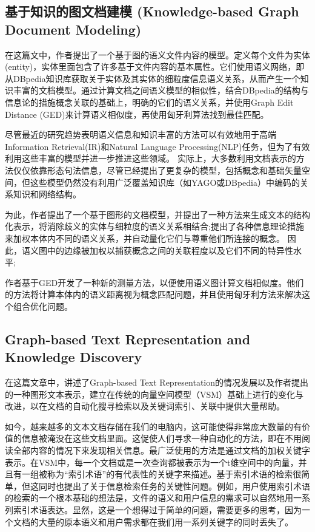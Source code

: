 \documentclass[UTF8]{ctexart}
\begin{document}
\subsection{基于知识的图文档建模 (Knowledge-based Graph Document Modeling)}
在这篇文中，作者提出了一个基于图的语义文件内容的模型。定义每个文件为实体(entity)，实体里面包含了许多基于文件内容的基本属性。它们使用语义网络，即从DBpedia知识库获取关于实体及其实体的细粒度信息语义关系，从而产生一个知识丰富的文档模型。通过计算文档之间语义模型的相似性，结合DBpedia的结构与信息论的措施概念关联的基础上，明确的它们的语义关系，并使用Graph Edit Distance (GED)来计算语义相似度，再使用匈牙利算法找到最佳匹配。

尽管最近的研究趋势表明语义信息和知识丰富的方法可以有效地用于高端Information Retrieval(IR)和Natural Language Processing(NLP)任务，但为了有效利用这些丰富的模型并进一步推进这些领域。 实际上，大多数利用文档表示的方法仅仅依靠形态句法信息，尽管已经提出了更复杂的模型，包括概念和基础矢量空间，但这些模型仍然没有利用广泛覆盖知识库（如YAGO或DBpedia）中编码的关系知识和网络结构。

为此，作者提出了一个基于图形的文档模型，并提出了一种方法来生成文本的结构化表示，将消除歧义的实体与细粒度的语义关系相结合;提出了各种信息理论措施来加权本体内不同的语义关系，并自动量化它们与尊重他们所连接的概念。 因此，语义图中的边缘被加权以捕获概念之间的关联程度以及它们不同的特异性水平;

作者基于GED开发了一种新的测量方法，以便使用语义图计算文档相似度。他们的方法将计算本体内的语义距离视为概念匹配问题，并且使用匈牙利方法来解决这个组合优化问题。

\subsection{Graph-based Text Representation and Knowledge Discovery}
在这篇文章中，讲述了Graph-based Text Representation的情况发展以及作者提出的一种图形文本表示，建立在传统的向量空间模型（VSM）基础上进行的变化与改进，以在文档的自动化搜寻检索以及关键词索引、关联中提供大量帮助。

如今，越来越多的文本文档存储在我们的电脑内，这可能使得非常庞大数量的有价值的信息被淹没在这些文档里面。这促使人们寻求一种自动化的方法，即在不用阅读全部内容的情况下来发现相关信息。最广泛使用的方法是通过文档的加权关键字表示。在VSM中，每一个文档或是一次查询都被表示为一个t维空间中的向量，并且有一组被称为“索引术语”的有代表性的关键字来描述。基于索引术语的检索很简单，但这同时也提出了关于信息检索任务的关键性问题。例如，用户使用索引术语的检索的一个根本基础的想法是，文件的语义和用户信息的需求可以自然地用一系列索引术语表达。显然，这是一个想得过于简单的问题，需要更多的思考，因为一个文档的大量的原本语义和用户需求都在我们用一系列关键字的同时丢失了。
\end{document}
